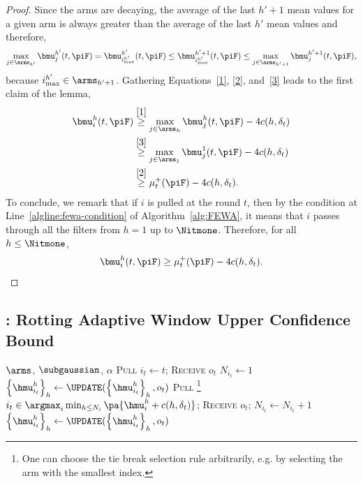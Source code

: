 \begin{proof}
Since the arms are decaying, the average of the last $h' +1$ mean values for a given arm is always greater than the average of the last $h'$ mean values
and therefore, 
\begin{equation}
\label{3}
 \max_{j \in \arms_{h'}}\bmu_j^{h'}(t,\piF) =   \bmu_{i^{h'}_{\max}}^{h'}(t,\piF) \leq \bmu_{i^{h'}_{\max}}^{h'+1}(t,\piF) \leq \max_{j \in \arms_{h'+1}}\bmu^{h' +1 }_{j}(t,\piF), 
\end{equation}
because $i^{h'}_{\rm max} \in \arms_{h'+1}$. Gathering Equations~\ref{1}, \ref{2}, and~\ref{3} leads to the first claim of the lemma,
\begin{align*}
\bmu^{h}_i(t,\piF)
&\stackrel{\eqref{1}}{\geq} \max_{j \in \arms_h}\bmu^{h}_{j}(t,\piF) - 4c(h, \delta_t)\\
&\stackrel{\eqref{3}}{\geq} \max_{j \in \arms_1}\bmu^{1}_{j}(t,\piF)- 4c(h,  \delta_t)\\
&\stackrel{\eqref{2}}{\geq}  \mu^+_t(\piF) - 4c(h, \delta_t).
\end{align*}
To conclude, we remark that if $i$ is pulled at the round $t$, then by the condition at Line~\ref{algline:fewa-condition} of Algorithm~\ref{alg:FEWA}, it means that $i$ passes through all the filters from $h=1$ up to $\Nitmone$. Therefore, for all $h\leq \Nitmone$,
%
\begin{equation}
\bmu^{h}_i(t,\piF) \geq  \mu^+_t(\piF) - 4 c(h, \delta_t).
\end{equation}
\end{proof}

\subsection{{\RUCB}: Rotting Adaptive Window Upper Confidence Bound}
\label{ss:rawucb}

 \begin{minipage}{\textwidth}
\renewcommand*\footnoterule{}
\begin{savenotes}
\begin{algorithm}[H]
\caption{{\RUCB}}
\label{alg:RAWUCB}
\begin{algorithmic}[1]
\Require $\arms$,  $\subgaussian$, $\alpha$
	\State \textsc{Pull}  $i_t \gets t$; \textsc{Receive} $o_{t}$
	\State $N_{i_t} \gets 1$
	\State $\left\{\hmu_{i_t}^h\right\}_h \gets \UPDATE(\left\{\hmu_{i_t}^h\right\}_h, o_t)$ \label{algline:raw-update1}
\EndFor
{}
	\State \textsc{Pull} \footnote{One can choose the tie break selection rule arbitrarily, e.g. by selecting the arm with the smallest index.} $i_t \in \argmax_i \min_{h \leq N_{i}}\pa{\hmu_i^h + c(h, \delta_t)} $; \textsc{Receive} $o_{t}${\footnotesize {}}; \label{algline:raw-pull}
	\State  $N_{i_t} \gets N_{i_t} +1$
	\State $\left\{\hmu_{i_t}^h\right\}_h \gets \UPDATE(\left\{\hmu_{i_t}^h\right\}_h, o_t)$\label{algline:raw-update2}
\EndFor
\end{algorithmic}
\end{algorithm}
\end{savenotes}
\end{minipage}



